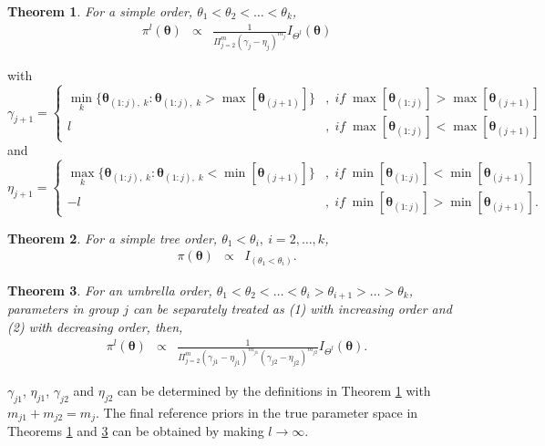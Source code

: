 \documentclass[Proceedings]{ascelike}
\newtheorem{thm}{Theorem}
\begin{document}
\begin{thm}
\label{theorem1}
For a simple order, $\theta_1<\theta_2<\hdots<\theta_k$,
\begin{eqnarray}
\pi^{l}(\boldsymbol{\theta})
& \propto &
\frac{1}{\Pi_{j=2}^{m}(\gamma_j-\eta_j)^{m_j}}I_{\Theta^{l}}(\boldsymbol{\theta})\nonumber
\end{eqnarray}
\end{thm}
with
\begin{displaymath}
\gamma_{j+1} = \left\{
\begin{array}{lr}
\min\limits_{k}\{\boldsymbol{\theta}_{(1:j),\;k}:\boldsymbol{\theta}_{(1:j),\;k}>\max[\boldsymbol{\theta}_{(j+1)}]\} &,\; if\; \max[\boldsymbol{\theta}_{(1:j)}]> \max[\boldsymbol{\theta}_{(j+1)}]\\
l &,\; if\; \max[\boldsymbol{\theta}_{(1:j)}]< \max[\boldsymbol{\theta}_{(j+1)}]
\end{array}
\right.
\end{displaymath} 
and
\begin{displaymath}
\eta_{j+1} = \left\{
\begin{array}{lr}
\max\limits_{k}\{\boldsymbol{\theta}_{(1:j),\;k}:\boldsymbol{\theta}_{(1:j),\;k}<\min[\boldsymbol{\theta}_{(j+1)}]\} &,\; if\; \min[\boldsymbol{\theta}_{(1:j)}]< \min[\boldsymbol{\theta}_{(j+1)}]\\
-l &,\; if\; \min[\boldsymbol{\theta}_{(1:j)}]> \min[\boldsymbol{\theta}_{(j+1)}].
\end{array}
\right.
\end{displaymath} 
\begin{thm}
\label{theorem2}
For a simple tree order, $\theta_1<\theta_i,\ i=2,\hdots,k$,
\begin{eqnarray}
\pi(\boldsymbol{\theta})
& \propto &
I_{(\theta_1<\theta_i)}.\nonumber
\end{eqnarray}
\end{thm}
\begin{thm} 
\label{theorem3}
For an umbrella order, $\theta_1<\theta_2<\hdots<\theta_i>\theta_{i+1}>\hdots>\theta_k$, parameters in group $j$ can be separately treated as (1) with increasing order and (2) with decreasing order, then,
\begin{eqnarray}
\pi^{l}(\boldsymbol{\theta})
& \propto &
\frac{1}{\Pi_{j=2}^{m}(\gamma_{j1}-\eta_{j1})^{m_{j1}}(\gamma_{j2}-\eta_{j2})^{m_{j2}}}I_{\Theta^{l}}(\boldsymbol{\theta}).\nonumber
\end{eqnarray}
\end{thm}
$\gamma_{j1}$, $\eta_{j1}$, $\gamma_{j2}$ and $\eta_{j2}$ can be determined by the definitions in Theorem \ref{theorem1} with $m_{j1}+m_{j2}=m_j$. The final reference priors in the true parameter space in Theorems \ref{theorem1} and \ref{theorem3} can be obtained by making $l\to\infty$.
\end{document}
